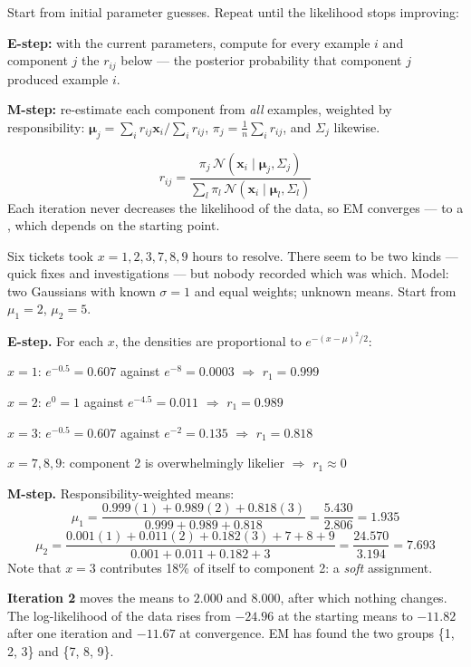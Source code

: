 \begin{definitionbox}
Start from initial parameter guesses. Repeat until the likelihood stops improving:
\begin{tight}
  \item \textbf{E-step:} with the current parameters, compute for every example
        $i$ and component $j$ the  $r_{ij}$ below --- the
        posterior probability that component $j$ produced example $i$.
  \item \textbf{M-step:} re-estimate each component from \emph{all} examples,
        weighted by responsibility: $\boldsymbol{\mu}_j = \sum_i r_{ij}\mathbf{x}_i / \sum_i r_{ij}$,
        $\pi_j = \tfrac{1}{n}\sum_i r_{ij}$, and $\Sigma_j$ likewise.
\end{tight}
\[
r_{ij} = \frac{\pi_j\,\mathcal{N}(\mathbf{x}_i \mid \boldsymbol{\mu}_j, \Sigma_j)}
              {\sum_{l}\pi_l\,\mathcal{N}(\mathbf{x}_i \mid \boldsymbol{\mu}_l, \Sigma_l)}
\]
Each iteration never decreases the likelihood of the data, so EM converges --- to a
, which depends on the starting point.
\end{definitionbox}

\begin{worked}
Six tickets took $x = 1, 2, 3, 7, 8, 9$ hours to resolve. There seem to be two kinds
--- quick fixes and investigations --- but nobody recorded which was which. Model:
two Gaussians with known $\sigma = 1$ and equal weights; unknown means. Start from
$\mu_1 = 2$, $\mu_2 = 5$.

\smallskip
\textbf{E-step.} For each $x$, the densities are proportional to
$e^{-(x-\mu)^2/2}$:
\begin{tight}
  \item $x = 1$: $e^{-0.5} = 0.607$ against $e^{-8} = 0.0003$ $\Rightarrow$ $r_1 = 0.999$
  \item $x = 2$: $e^{0} = 1$ against $e^{-4.5} = 0.011$ $\Rightarrow$ $r_1 = 0.989$
  \item $x = 3$: $e^{-0.5} = 0.607$ against $e^{-2} = 0.135$ $\Rightarrow$ $r_1 = 0.818$
  \item $x = 7, 8, 9$: component 2 is overwhelmingly likelier $\Rightarrow$ $r_1 \approx 0$
\end{tight}
\textbf{M-step.} Responsibility-weighted means:
\[
\mu_1 = \frac{0.999(1) + 0.989(2) + 0.818(3)}{0.999 + 0.989 + 0.818} = \frac{5.430}{2.806} = \mathbf{1.935}
\]
\[
\mu_2 = \frac{0.001(1) + 0.011(2) + 0.182(3) + 7 + 8 + 9}{0.001 + 0.011 + 0.182 + 3} = \frac{24.570}{3.194} = \mathbf{7.693}
\]
Note that $x = 3$ contributes 18\% of itself to component 2: a \emph{soft}
assignment.

\smallskip
\textbf{Iteration 2} moves the means to $2.000$ and $8.000$, after which nothing
changes. The log-likelihood of the data rises from $-24.96$ at the starting means to
$-11.82$ after one iteration and $-11.67$ at convergence. EM has found the two groups
\{1, 2, 3\} and \{7, 8, 9\}.
\end{worked}

